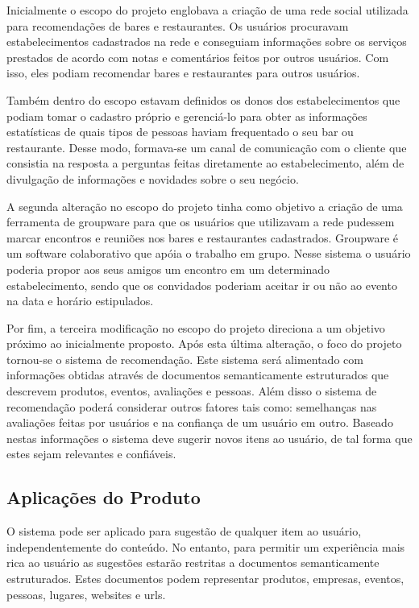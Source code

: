  Inicialmente o escopo do projeto englobava a criação de uma rede social utilizada para recomendações de bares e restaurantes. Os usuários procuravam estabelecimentos cadastrados na rede e conseguiam informações sobre os serviços prestados de acordo com notas e comentários feitos por outros usuários. Com isso, eles podiam recomendar bares e restaurantes para outros usuários.

 Também dentro do escopo estavam definidos os donos dos estabelecimentos que podiam tomar o cadastro próprio e gerenciá-lo para obter as informações estatísticas de quais tipos de pessoas haviam frequentado o seu bar ou restaurante. Desse modo, formava-se um canal de comunicação com o cliente que consistia na resposta a perguntas feitas diretamente ao estabelecimento, além de divulgação de informações e novidades sobre o seu negócio.

 A segunda alteração no escopo do projeto tinha como objetivo a criação de uma ferramenta de groupware para que os usuários que utilizavam a rede pudessem marcar encontros e reuniões nos bares e restaurantes cadastrados. Groupware é um software colaborativo que apóia o trabalho em grupo. Nesse sistema o usuário poderia propor aos seus amigos um encontro em um determinado estabelecimento, sendo que os convidados poderiam aceitar ir ou não ao evento na data e horário estipulados.

 Por fim, a terceira modificação no escopo do projeto direciona a um objetivo próximo ao inicialmente proposto. Após esta última alteração, o foco do projeto tornou-se o sistema de recomendação. Este sistema será alimentado com informações obtidas através de documentos semanticamente estruturados que descrevem produtos, eventos, avaliações e pessoas. Além disso o sistema de recomendação poderá considerar outros fatores tais como: semelhanças nas avaliações feitas por usuários e na confiança de um usuário em outro. Baseado nestas informações o sistema deve sugerir novos itens ao usuário, de tal forma que estes sejam relevantes e confiáveis.

\subsection{Aplicações do Produto}
 
 O sistema pode ser aplicado para sugestão de qualquer item ao usuário, independentemente do conteúdo. No entanto, para permitir um experiência mais rica ao usuário as sugestões estarão restritas a documentos semanticamente estruturados. Estes documentos podem representar produtos, empresas, eventos, pessoas, lugares, websites e urls.
 
